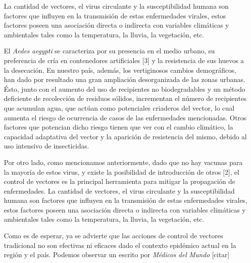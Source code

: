 \par La cantidad de vectores, el virus circulante y la
susceptibilidad humana son factores que influyen en la transmisión de estas
enfermedades virales, estos factores poseen una asociación directa o indirecta
con variables climáticas y ambientales tales como la temperatura, la lluvia,
la vegetación, etc.

\par El \textit{Aedes aegypti} se caracteriza por su presencia en el medio urbano, su preferencia
de cría en contenedores artificiales [3] y la resistencia de sus huevos a la
desecación. En nuestro país, además, los vertiginosos cambios demográficos, han dado
por resultado una gran ampliación desorganizada de las zonas urbanas. Ésto, junto
con el aumento del uso de recipientes no biodegradables y un método deficiente
de recolección de residuos sólidos, incrementan el número de recipientes que
acumulan agua, que actúan como potenciales criaderos del vector, lo cual aumenta el
riesgo de ocurrencia de casos de las enfermedades mencionadas.
Otros factores que potencian dicho riesgo tienen que ver con el cambio climático,
la capacidad adaptativa del vector y la aparición de resistencia del mismo,
debido al uso intensivo de insecticidas.

\par Por otro lado, como mencionamos anteriormente, dado que no hay vacunas para la
mayoría de estos virus, y existe la posibilidad de introducción de otros [2],
el control de vectores es la principal herramienta para mitigar la
propagación de enfermedades. La cantidad de vectores, el virus circulante y la
susceptibilidad humana son factores que influyen en la transmisión de estas
enfermedades virales, estos factores poseen una asociación directa o indirecta
con variables climáticas y ambientales tales como la temperatura, la lluvia,
la vegetación, etc.

\par Como es de esperar, ya se advierte que las acciones de control de vectores tradicional no
son efectivas ni eficaces dado el contexto epidémico actual en la región y el país.
Podemos observar un escrito por \textit{Médicos del Mundo} [citar]

